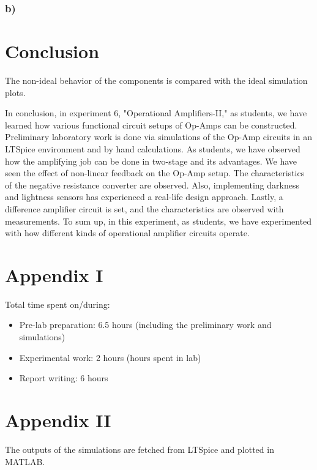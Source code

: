 \documentclass[letterpaper,12pt]{article}
\begin{document}
\subsubsection{b)}

\section{Conclusion}
The non-ideal behavior of the components is compared with the ideal simulation plots.

In conclusion, in experiment 6, "Operational Amplifiers-II," as students, we have learned how various functional circuit setups of Op-Amps can be constructed. Preliminary laboratory work is done via simulations of the Op-Amp circuits in an LTSpice environment and by hand calculations. As students, we have observed how the amplifying job can be done in two-stage and its advantages. We have seen the effect of non-linear feedback on the Op-Amp setup. The characteristics of the negative resistance converter are observed. Also, implementing darkness and lightness sensors has experienced a real-life design approach. Lastly, a difference amplifier circuit is set, and the characteristics are observed with measurements. To sum up, in this experiment, as students, we have experimented with how different kinds of operational amplifier circuits operate. 
\section*{Appendix I}
Total time spent on/during:
\begin{itemize}
	\item Pre-lab preparation: 6.5 hours (including the preliminary work and simulations) 
	\item Experimental work: 2 hours (hours spent in lab)
	\item Report writing: 6 hours 
\end{itemize}
\section*{Appendix II}
The outputs of the simulations are fetched from LTSpice and plotted in MATLAB.



\end{document}
